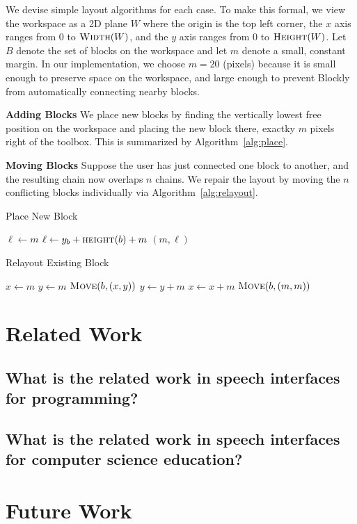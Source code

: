 \documentclass[]{article}
\begin{document}
We devise simple layout algorithms for each case. To make this formal, we view
the workspace as a 2D plane $W$ where the origin is the top left corner, the $x$ axis ranges from 0
to $\textsc{Width}(W)$, and the $y$ axis ranges from 0 to $\textsc{Height}(W)$.
Let $B$ denote the set of blocks on the workspace and let $m$ denote a small, constant margin.
In our implementation, we choose $m = 20$ (pixels) because it is small enough to preserve space
on the workspace, and large enough to prevent Blockly from automatically connecting nearby blocks.

\textbf{Adding Blocks} We place new blocks by finding the vertically lowest free
position on the workspace and placing the new block there, exactky $m$ pixels right of
the toolbox. This is summarized by Algorithm~\ref{alg:place}.

\textbf{Moving Blocks} Suppose the user has just connected one block to another, and the
resulting chain now overlaps $n$ chains. We repair the layout by moving the $n$ conflicting
blocks individually via Algorithm~\ref{alg:relayout}. 

\begin{algorithm}[H]
\caption{Place New Block}\label{alg:place}
\begin{algorithmic}
\State $\ell \gets m$ 
		\State $\ell \gets y_b + \textsc{height}(b) + m$
	\EndIf
\EndFor
\State \Return $(m, \ell)$
\EndProcedure
\end{algorithmic}
\end{algorithm}

\begin{algorithm}[H]
\caption{Relayout Existing Block}\label{alg:relayout}
\begin{algorithmic}
\State $x \gets m$
	\State $y \gets m$
				\State $\textsc{Move}(b, (x,y))$
		\EndIf
		\State $y \gets y + m$
	\EndWhile
	\State $x \gets x + m$
\EndWhile
\State $\textsc{Move}(b, (m,m))$
\EndProcedure
\end{algorithmic}
\end{algorithm}

\section{Related Work}

\subsection{What is the related work in speech interfaces for programming?}

\subsection{What is the related work in speech interfaces for computer science education?}


\section{Future Work}
\end{document}
